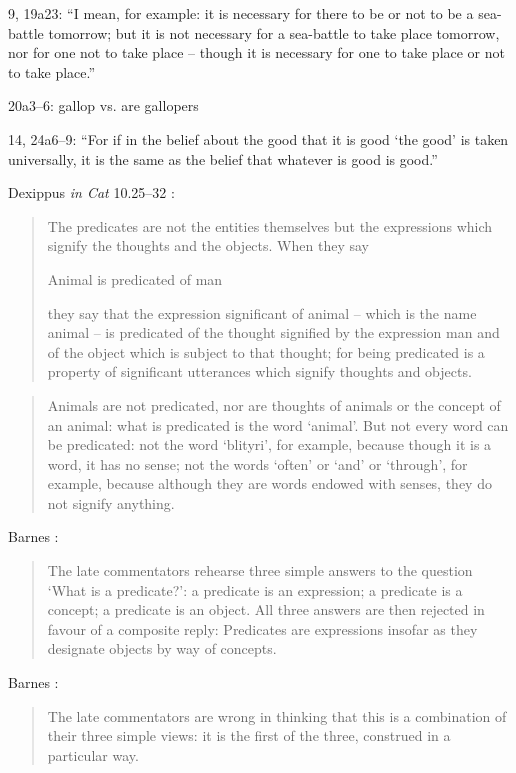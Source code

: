 \documentclass{article}
\begin{document}
9, 19a23: ``I mean, for example: it is necessary for there to be or not to be
a sea-battle tomorrow; but it is not necessary for a sea-battle
to take place tomorrow, nor for one not to take place -- 
though it is necessary for one to take place or not
to take place.'' \cite[p.~53]{ackrill}

20a3--6: gallop vs. are gallopers

14, 24a6--9: ``For if in the belief about the good that it is good `the good' is taken universally,
it is the same as the belief that whatever is good is good.'' \cite[p.~67]{ackrill}

Dexippus {\em in Cat} 10.25--32 \cite[p.~116]{barnes}:

\begin{quote}
The predicates are not the entities themselves but the expressions which signify the thoughts and the objects.
When they say

Animal is predicated of man

they say that the expression significant of animal -- which is the name animal -- is predicated of the thought signified by the expression man and of the object which is subject to that thought; for being predicated is a property of significant utterances which signify thoughts and objects.
\end{quote}

\begin{quote}
Animals are not predicated, nor are thoughts of animals or the concept of an animal: what is predicated is the word
`animal'. But not every word can be predicated: not the word `blityri', for example, because though it is a word, it has no sense; not the words `often' or `and' or `through',
for example, because although they are words endowed with senses, they do not signify anything.
\end{quote}

Barnes \cite[p.~69]{isagoge}:

\begin{quote}
The late commentators rehearse three simple answers to the question `What is a predicate?': a predicate is an expression; a predicate is a concept; a predicate is an object.
All three answers are then rejected in favour of a composite reply: Predicates are expressions insofar as they designate objects by way of concepts.
\end{quote}

Barnes \cite[p.~70]{isagoge}:

\begin{quote}
The late commentators are wrong in thinking that this is a combination of their three simple views: it is the first of the three, construed in a particular way.
\end{quote}
\end{document}

